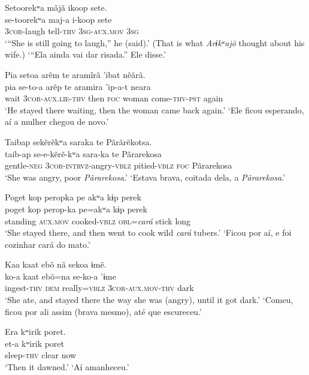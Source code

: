 \documentclass[output=paper,
modfonts,nonflat
]{langsci/langscibook}
\begin{document}
\ea Setoorekʷa mãjã ikoop sete.\\[.3em]
\gll se-toorekʷa maj-a i-koop sete\\
     \textsc{3cor}-laugh tell-\textsc{thv} \textsc{3sg}-\textsc{aux.mov} \textsc{3sg}\\
\glt ‘“She is still going to laugh,” he (said).’ (That is what \textit{Arɨkʷajõ} thought about his wife.)
\glt ‘“Ela ainda vai dar risada.” Ele disse.'
\z  

\ea Pia setoa arẽm te aramĩrã 'ibat nẽãrã.\\[.3em]
\gll pia se-to-a arẽp te aramira 'ip-a-t neara\\
     wait \textsc{3cor}-\textsc{aux.lie-thv} then \textsc{foc} woman come-\textsc{thv-pst} again\\
\glt ‘He stayed there waiting, then the woman came back again.’
\glt ‘Ele ficou esperando, aí a mulher chegou de novo.'
\z 
 

\ea Taibap sekẽrẽkʷa saraka te Pãrãrẽkotsa.\\[.3em]
\gll taib-ap se-e-kẽrẽ-kʷa sara-ka te Pãrarekosa\\
     gentle-\textsc{neg} \textsc{3cor}-\textsc{intrvz}-angry-\textsc{vblz}	 pitied-\textsc{vblz} \textsc{foc} Pãrarekosa\\
\glt ‘She was angry, poor \textit{Pãrarekosa}.’ 
\glt ‘Estava brava, coitada dela, a \textit{Pãrarekosa}.'
\z 

\newpage 
\ea Poget kop peropka pe akʷa kɨp perek\\[.3em]
\gll poget kop perop-ka pe=akʷa kɨp perek\\
     standing \textsc{aux.mov} cooked-\textsc{vblz} \textsc{obl}=\textit{cará} stick long\\
\glt ‘She stayed there, and then went to cook wild \textit{cará} tubers.’
\glt ‘Ficou por aí, e foi cozinhar cará do mato.'
\z 

\ea Kaa kaat ebõ nã sekoa ɨmẽ.\\[.3em]
\gll ko-a kaat ebõ=na se-ko-a 'ɨme\\
     ingest-\textsc{thv} \textsc{dem} really=\textsc{vblz} \textsc{3cor-aux.mov-thv} dark\\
\glt ‘She ate, and stayed there the way she was (angry), until it got dark.’
\glt ‘Comeu, ficou por ali assim (brava mesmo), até que escureceu.'
\z 

\ea Era kʷirik poret.\\[.3em]
\gll et-a kʷirik poret\\
     sleep-\textsc{thv} clear now\\
\glt ‘Then it dawned.’{\footnotemark}
\glt ‘Aí amanheceu.'
\z 
\end{document}
